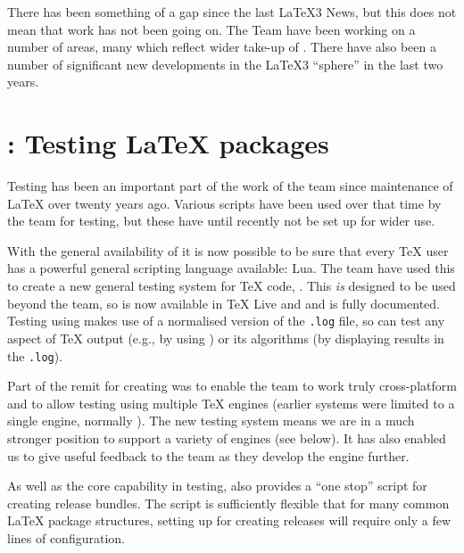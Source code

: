 \documentclass{ltnews}
\begin{document}
\maketitle

There has been something of a gap since the last \LaTeX3 News, but this does
not mean that work has not been going on. The Team have been working on a
number of areas, many which reflect wider take-up of . There have
also been a number of significant new developments in the \LaTeX3
\enquote{sphere} in the last two years.

\section{: Testing \LaTeX{} packages}

Testing has been an important part of the work of the team since maintenance of
\LaTeX{} over twenty years ago. Various scripts have been used over that time
by the team for testing, but these have until recently not be set up for wider
use.

With the general availability of  it is now possible to be sure
that every \TeX{} user has a powerful general scripting language available:
Lua. The team have used this to create a new general testing system for \TeX{}
code, . This \emph{is} designed to be used beyond the team, so is
now available in \TeX{} Live and  and is fully documented.
Testing using  makes use of a normalised version of the
\texttt{.log} file, so can test any aspect of \TeX{} output (e.g., by using
) or its algorithms (by displaying results in the \texttt{.log}).

Part of the remit for creating  was to enable the team to work
truly cross-platform and to allow testing using multiple \TeX{} engines
(earlier systems were limited to a single engine, normally \eTeX{}). The new
testing system means we are in a much stronger position to support a variety of
engines (see below). It has also enabled us to give useful feedback to the
 team as they develop
the  engine
further.

As well as the core capability in testing,  also provides a
\enquote{one stop} script for creating release bundles. The script is
sufficiently flexible that for many common \LaTeX{} package structures, setting
up for creating releases will require only a few lines of configuration.
\end{document}
